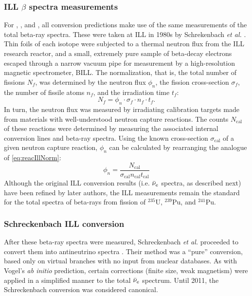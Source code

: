 \documentclass[../thesis.tex]{subfiles}
\begin{document}
\subsubsection{ILL $\beta$ spectra measurements}
\label{sec:illmeas}

For \urfive, \punine, and \puone, all conversion predictions make use of the same measurements of the total beta-ray spectra. These were taken at ILL in 1980s by Schrekenbach \emph{et al.} \cite{SCHRECKENBACH1981251,VONFEILITZSCH1982162,SCHRECKENBACH1985325,HAHN1989365}. Thin foils of each isotope were subjected to a thermal neutron flux from the ILL research reactor, and a small, extremely pure sample of beta-decay electrons escaped through a narrow vacuum pipe for measurement by a high-resolution magnetic spectrometer, BILL.
The normalization, that is, the total number of fissions $N_f$, was determined by the neutron flux $\phi_n$, the fission cross-section $\sigma_f$, the number of fissile atoms $n_f$, and the irradiation time $t_f$:
\begin{equation}
  \label{eq:reacIllNorm}
  N_f = \phi_n \cdot \sigma_f \cdot n_f \cdot t_f.
\end{equation}
In turn, the neutron flux was measured by irradiating calibration targets made from materials with well-understood neutron capture reactions. The counts $N_{\mathrm{cal}}$ of these reactions were determined by measuring the associated internal conversion lines and beta-ray spectra. Using the known cross-section $\sigma_{\mathrm{cal}}$ of a given neutron capture reaction, $\phi_n$ can be calculated by rearranging the analogue of \autoref{eq:reacIllNorm}:
\begin{equation}
  \phi_n = \frac{N_{\mathrm{cal}}}{\sigma_{\mathrm{cal}} n_{\mathrm{cal}} t_{\mathrm{cal}}}
\end{equation}
Although the original ILL conversion results (i.e. $\bar\nu_e$ spectra, as described next) have been refined by later authors, the ILL measurements remain the standard for the total spectra of beta-rays from fission of $^{235}$U, $^{239}$Pu, and $^{241}$Pu.

\subsubsection{Schreckenbach ILL conversion}
\label{sec:schreck}

After these beta-ray spectra were measured, Schreckenbach \emph{et al.} proceeded to convert them into antineutrino spectra \cite{SCHRECKENBACH1981251,VONFEILITZSCH1982162,SCHRECKENBACH1985325,HAHN1989365}. Their method was a ``pure'' conversion, based only on virtual branches with no input from nuclear databases. As with Vogel's \ureight \emph{ab initio} prediction, certain corrections (finite size, weak magnetism) were applied in a simplified manner to the total $\bar\nu_e$ spectrum. Until 2011, the Schreckenbach conversion was considered canonical.
\end{document}
